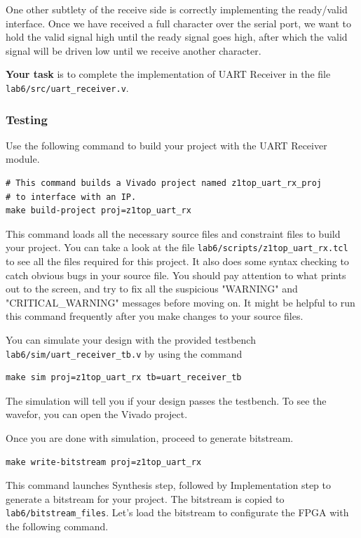 \documentclass[11pt]{article}
\begin{document}
One other subtlety of the receive side is correctly implementing the ready/valid interface.
Once we have received a full character over the serial port, we want to hold the valid signal high until the ready signal goes high, after which the valid signal will be driven low until we receive another character.

\textbf{Your task} is to complete the implementation of UART Receiver in the file \verb|lab6/src/uart_receiver.v|.

\subsubsection{Testing}

Use the following command to build your project with the UART Receiver module.

\begin{verbatim}
# This command builds a Vivado project named z1top_uart_rx_proj
# to interface with an IP.
make build-project proj=z1top_uart_rx
\end{verbatim}

This command loads all the necessary source files and constraint files to build your project. You can take a look at the file \verb|lab6/scripts/z1top_uart_rx.tcl| to see all the files required for this project. It also does some syntax checking to catch obvious bugs in your source file. You should pay attention to what prints out to the screen, and try to fix all the suspicious "WARNING" and "CRITICAL\_WARNING" messages before moving on. It might be helpful to run this command frequently after you make changes to your source files.

You can simulate your design with the provided testbench \verb|lab6/sim/uart_receiver_tb.v| by using the command

\begin{verbatim}
make sim proj=z1top_uart_rx tb=uart_receiver_tb
\end{verbatim}

The simulation will tell you if your design passes the testbench. To see the wavefor, you can open the Vivado project.

Once you are done with simulation, proceed to generate bitstream.

\begin{verbatim}
make write-bitstream proj=z1top_uart_rx
\end{verbatim}

This command launches Synthesis step, followed by Implementation step to generate a bitstream for your project. The bitstream is copied to \verb|lab6/bitstream_files|. Let's load the bitstream to configurate the FPGA with the following command.
\end{document}
